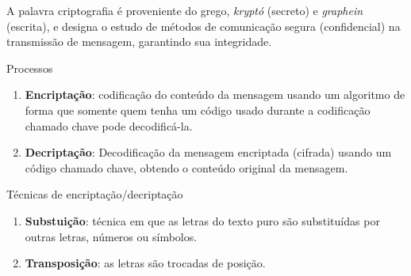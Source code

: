 
\def\biblioref{

  "Criptografia e Segurança de Redes: Princípios e Práticas".  William
  Stallings. Editora Pearson, 4$^a$ edição, 2008.

}



\lecturetitle{\insertlecture}{\course}

\frame{\maketitle}


\begin{frame}{\insertlecture}
 A palavra \alert{criptografia} é proveniente do grego, {\it kryptó}
   (secreto) e {\it graphein} (escrita), e designa o estudo de métodos
   de comunicação segura (confidencial) na transmissão de mensagem,
   garantindo sua integridade.
\end{frame}

\begin{frame}{Processos}

\begin{enumerate}

\item {\bf Encriptação}: codificação do conteúdo da mensagem usando um
algoritmo de forma que somente quem tenha um código usado durante a
codificação chamado chave pode decodificá-la.

\item {\bf Decriptação}: Decodificação da mensagem encriptada (cifrada)
usando um código chamado chave, obtendo o conteúdo original da
mensagem.

\end{enumerate}

\end{frame}


\begin{frame}{Técnicas de encriptação/decriptação}

\begin{enumerate}
\item {\bf Substuição}: técnica em que as letras do texto puro são substituídas por outras 
letras, números ou símbolos.

\item {\bf Transposição}: as letras são trocadas de posição. 
\end{enumerate}

\end{frame}

